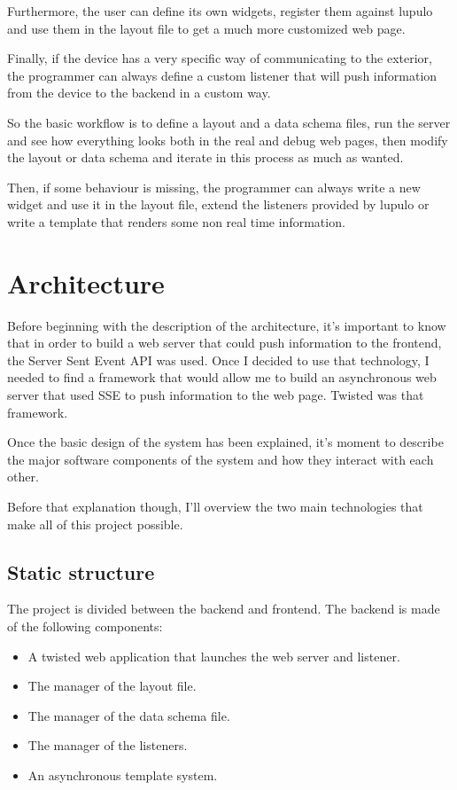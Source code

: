 \documentclass[12pt]{article}
\begin{document}
            Furthermore, the user can define its own widgets, register them
            against lupulo and use them in the layout file to get a much more
            customized web page.

            Finally, if the device has a very specific way of communicating to
            the exterior, the programmer can always define a custom listener
            that will push information from the device to the backend in a
            custom way.

            So the basic workflow is to define a layout and a data schema files,
            run the server and see how everything looks both in the real and
            debug web pages, then modify the layout or data schema and iterate
            in this process as much as wanted.

            Then, if some behaviour is missing, the programmer can always write
            a new widget and use it in the layout file, extend the listeners
            provided by lupulo or write a template that renders some non real time
            information.

    \section{Architecture}
        Before beginning with the description of the architecture, it's
        important to know that in order to build a web server that could push
        information to the frontend, the Server Sent Event API was used. Once
        I decided to use that technology, I needed to find a framework that
        would allow me to build an asynchronous web server that used SSE to push
        information to the web page. Twisted was that framework.

        Once the basic design of the system has been explained, it's moment to
        describe the major software components of the system and how they
        interact with each other.

        Before that explanation though, I'll overview the two main technologies
        that make all of this project possible.

        \subsection{Static structure}
            The project is divided between the backend and frontend. The
            backend is made of the following components:

            \begin{itemize}
                \item A twisted web application that launches the web
                      server and listener.
                \item The manager of the layout file.
                \item The manager of the data schema file.
                \item The manager of the listeners.
                \item An asynchronous template system.
            \end{itemize}
\end{document}
